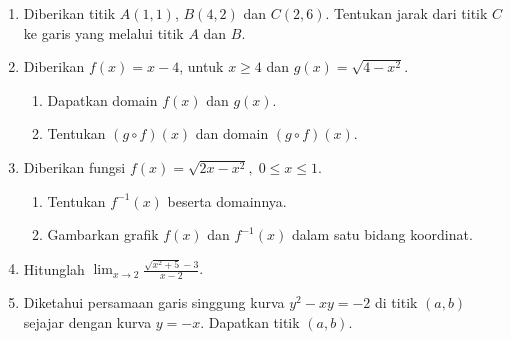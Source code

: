\documentclass[11pt,openany,a4paper]{article}
\begin{document}
\begin{enumerate}
    \item Diberikan titik $A(1,1)$, $B(4,2)$ dan $C(2,6)$. Tentukan jarak dari titik $C$ ke garis yang melalui titik $A$ dan $B$.

    \item Diberikan $f(x) = x - 4$, untuk $x \geq 4$ dan $g(x) = \sqrt{4 - x^2}$.
          \begin{enumerate}
              \item Dapatkan domain $f(x)$ dan $g(x)$.
              \item Tentukan $(g \circ f)(x)$ dan domain $(g \circ f)(x)$.
          \end{enumerate}

    \item Diberikan fungsi $f(x) = \sqrt{2x - x^2}, \; 0 \leq x \leq 1$.
          \begin{enumerate}
              \item Tentukan $f^{-1}(x)$ beserta domainnya.
              \item Gambarkan grafik $f(x)$ dan $f^{-1}(x)$ dalam satu bidang koordinat.
          \end{enumerate}

    \item Hitunglah
          $\displaystyle
              \lim_{x \to 2} \frac{\sqrt{x^2 + 5} - 3}{x - 2}.
          $

    \item Diketahui persamaan garis singgung kurva $y^2 - xy = -2$ di titik $(a,b)$ sejajar dengan kurva $y = -x$.
          Dapatkan titik $(a,b)$.

\end{enumerate}

\end{document}
